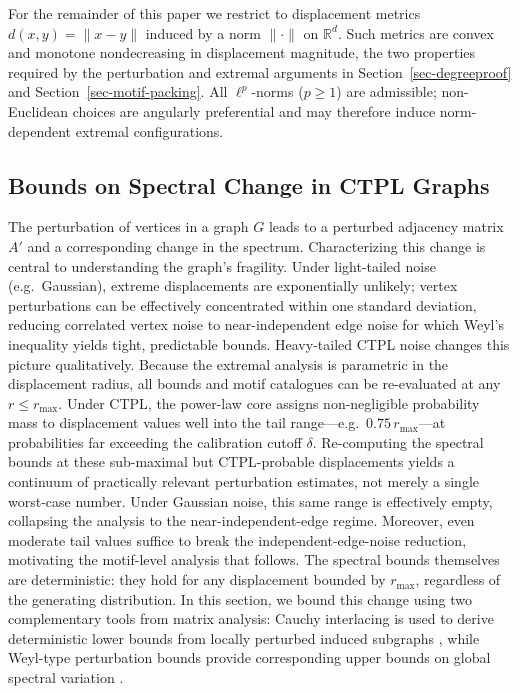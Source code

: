 \documentclass[
  11pt,
  letterpaper]{siamart251216}
\begin{document}
For the remainder of this paper we restrict to displacement metrics
\(d(x,y) = \|x-y\|\) induced by a norm \(\|\cdot\|\) on
\(\mathbb{R}^d\). Such metrics are convex and monotone nondecreasing in
displacement magnitude, the two properties required by the perturbation
and extremal arguments in Section~\ref{sec-degreeproof} and
Section~\ref{sec-motif-packing}. All \(\ell^p\)-norms (\(p \ge 1\)) are
admissible; non-Euclidean choices are angularly preferential and may
therefore induce norm-dependent extremal configurations.

\subsection{\texorpdfstring{Bounds on Spectral Change in \ac{CTPL}
Graphs}{Bounds on Spectral Change in  Graphs}}\label{sec-spectral-bounds}

The perturbation of vertices in a graph \(G\) leads to a perturbed
adjacency matrix \(A'\) and a corresponding change in the spectrum.
Characterizing this change is central to understanding the graph's
fragility. Under light-tailed noise (e.g.~Gaussian), extreme
displacements are exponentially unlikely; vertex perturbations can be
effectively concentrated within one standard deviation, reducing
correlated vertex noise to near-independent edge noise for which Weyl's
inequality yields tight, predictable bounds. Heavy-tailed \ac{CTPL}
noise changes this picture qualitatively. Because the extremal analysis
is parametric in the displacement radius, all bounds and motif
catalogues can be re-evaluated at any \(r \le r_{\max}\). Under
\ac{CTPL}, the power-law core assigns non-negligible probability mass to
displacement values well into the tail
range---e.g.~\(0.75\,r_{\max}\)---at probabilities far exceeding the
calibration cutoff \(\delta\). Re-computing the spectral bounds at these
sub-maximal but CTPL-probable displacements yields a continuum of
practically relevant perturbation estimates, not merely a single
worst-case number. Under Gaussian noise, this same range is effectively
empty, collapsing the analysis to the near-independent-edge regime.
Moreover, even moderate tail values suffice to break the
independent-edge-noise reduction, motivating the motif-level analysis
that follows. The spectral bounds themselves are deterministic: they
hold for any displacement bounded by \(r_{\max}\), regardless of the
generating distribution. In this section, we bound this change using two
complementary tools from matrix analysis: Cauchy interlacing is used to
derive deterministic lower bounds from locally perturbed induced
subgraphs \citep{Haemers1995, Chung1997Spectral}, while Weyl-type
perturbation bounds provide corresponding upper bounds on global
spectral variation \citep{Weyl1912, StewartSun1990, Bhatia1997}.
\end{document}
